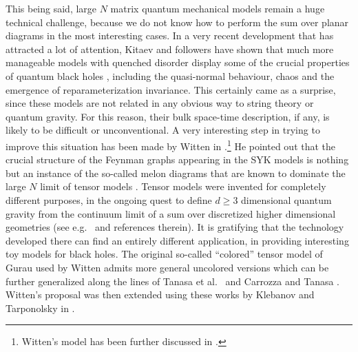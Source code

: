 \documentclass[12pt]{article}
\numberwithin{equation}{section}
\begin{document}
This being said, large $N$ matrix quantum mechanical models remain a huge technical challenge, because we do not know how to perform the sum over planar diagrams in the most interesting cases. In a very recent development that has attracted a lot of attention, Kitaev and followers have shown that much more manageable models with quenched disorder display some of the crucial properties of quantum black holes \cite{Kitaevetal}, including the quasi-normal behaviour, chaos and the emergence of reparameterization invariance. This certainly came as a surprise, since these models are not related in any obvious way to string theory or quantum gravity. For this reason, their bulk space-time description, if any, is likely to be difficult or unconventional. A very interesting step in trying to improve this situation has been made by Witten in \cite{witten}.\footnote{Witten's model has been further discussed in \cite{wittenmore}.} He pointed out that the crucial structure of the Feynman graphs appearing in the SYK models is nothing but an instance of the so-called melon diagrams that are known to dominate the large $N$ limit of tensor models \cite{Gurau1}. Tensor models were invented for completely different purposes, in the ongoing quest to define $d\geq 3$ dimensional quantum gravity from the continuum limit of a sum over discretized higher dimensional geometries (see e.g.\ \cite{Gurau2} and references therein). It is gratifying that the technology developed there can find an entirely different application, in providing interesting toy models for black holes. The original so-called ``colored'' tensor model of Gurau used by Witten admits more general uncolored versions \cite{Rivasseau1} which can be further generalized along the lines of Tanasa et al.\ \cite{Tanasa} and Carrozza and Tanasa \cite{Carrozzaetal}. Witten's proposal was then extended using these works by Klebanov and Tarponolsky in \cite{klebanov}.
\end{document}
